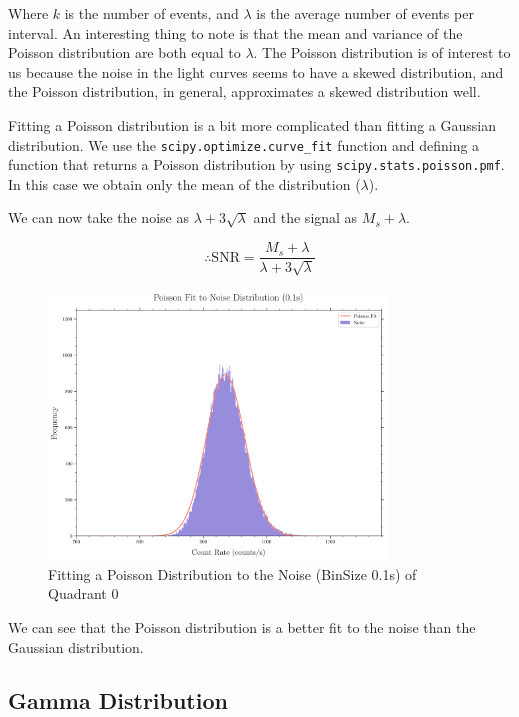 \documentclass[11pt]{book} %
\begin{document}
Where $k$ is the number of events, and $\lambda$ is the average number of events per interval. An interesting thing to note is that the mean and variance of the Poisson distribution are both equal to $\lambda$. The Poisson distribution is of interest to us because the noise in the light curves seems to have a skewed distribution, and the Poisson distribution, in general, approximates a skewed distribution well.

Fitting a Poisson distribution is a bit more complicated than fitting a Gaussian distribution. We use the \lstinline[language=Python]{scipy.optimize.curve_fit} function and defining a function that returns a Poisson distribution by using \lstinline[language=Python]{scipy.stats.poisson.pmf}. In this case we obtain only the mean of the distribution ($\lambda$). 

We can now take the noise as $\lambda+3\sqrt{\lambda}$ and the signal as $M_s+\lambda$. 

\begin{equation}
    \therefore \text{SNR} = \frac{M_s+\lambda}{\lambda+3\sqrt{\lambda}}
\end{equation}

\begin{figure}[H]
    \centering
    \includegraphics[width=0.8\textwidth]{Pictures/poisson_fit.png}
    \caption{Fitting a Poisson Distribution to the Noise (BinSize 0.1s) of Quadrant 0}
\end{figure}

We can see that the Poisson distribution is a better fit to the noise than the Gaussian distribution.


\subsection{Gamma Distribution}
\end{document}
